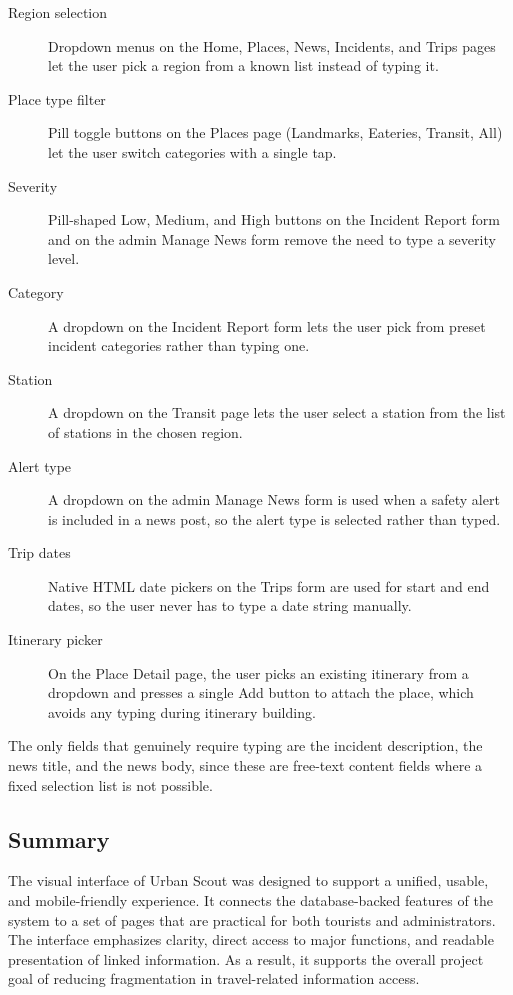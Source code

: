 \begin{description}
    \item[Region selection] Dropdown menus on the Home, Places, News, Incidents, and Trips pages let the user pick a region from a known list instead of typing it.
    \item[Place type filter] Pill toggle buttons on the Places page (Landmarks, Eateries, Transit, All) let the user switch categories with a single tap.
    \item[Severity] Pill-shaped Low, Medium, and High buttons on the Incident Report form and on the admin Manage News form remove the need to type a severity level.
    \item[Category] A dropdown on the Incident Report form lets the user pick from preset incident categories rather than typing one.
    \item[Station] A dropdown on the Transit page lets the user select a station from the list of stations in the chosen region.
    \item[Alert type] A dropdown on the admin Manage News form is used when a safety alert is included in a news post, so the alert type is selected rather than typed.
    \item[Trip dates] Native HTML date pickers on the Trips form are used for start and end dates, so the user never has to type a date string manually.
    \item[Itinerary picker] On the Place Detail page, the user picks an existing itinerary from a dropdown and presses a single Add button to attach the place, which avoids any typing during itinerary building.
\end{description}

The only fields that genuinely require typing are the incident description, the news title, and the news body, since these are free-text content fields where a fixed selection list is not possible.

\subsection{Summary}

The visual interface of Urban Scout was designed to support a unified, usable, and mobile-friendly experience. It connects the database-backed features of the system to a set of pages that are practical for both tourists and administrators. The interface emphasizes clarity, direct access to major functions, and readable presentation of linked information. As a result, it supports the overall project goal of reducing fragmentation in travel-related information access.
